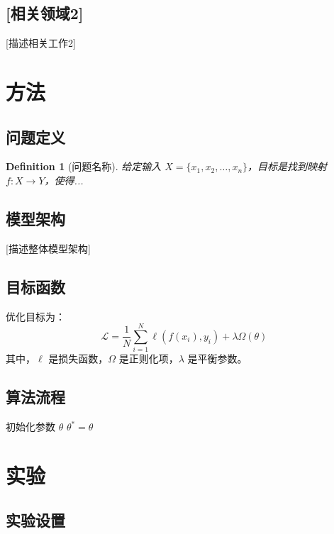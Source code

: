 \documentclass[12pt,a4paper]{article}
\newtheorem{definition}{Definition}
\begin{document}
\subsection{[相关领域2]}
[描述相关工作2]

\section{方法}

\subsection{问题定义}
\begin{definition}[问题名称]
给定输入 $X = \{x_1, x_2, \ldots, x_n\}$，目标是找到映射 $f: X \rightarrow Y$，使得...
\end{definition}

\subsection{模型架构}
[描述整体模型架构]

\subsection{目标函数}
优化目标为：
\begin{equation}
\mathcal{L} = \frac{1}{N} \sum_{i=1}^{N} \ell(f(x_i), y_i) + \lambda \Omega(\theta)
\label{eq:loss}
\end{equation}
其中，$\ell$ 是损失函数，$\Omega$ 是正则化项，$\lambda$ 是平衡参数。

\subsection{算法流程}
\begin{algorithm}[H]
\caption{算法名称}
\label{alg:algorithm}
初始化参数 $\theta$\;
\Return $\theta^* = \theta$\;
\end{algorithm}

\section{实验}

\subsection{实验设置}
\end{document}
